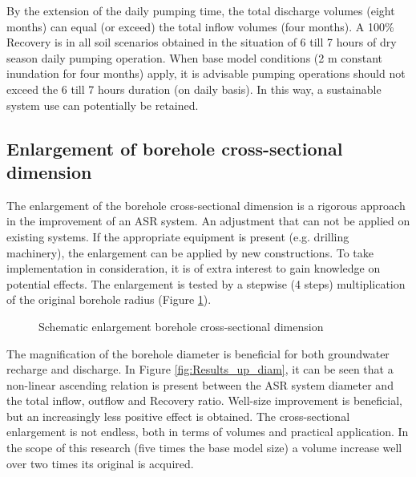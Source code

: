 By the extension of the daily pumping time, the total discharge volumes (eight months) can equal (or exceed) the total inflow volumes (four months). A 100\% Recovery is in all soil scenarios obtained in the situation of 6 till 7 hours of dry season daily pumping operation. When base model conditions (2 m constant inundation for four months) apply, it is advisable pumping operations should not exceed the 6 till 7 hours duration (on daily basis). In this way, a sustainable system use can potentially be retained. \\


\subsection{Enlargement of borehole cross-sectional dimension}
\label{Subsec:Up_diam}
The enlargement of the borehole cross-sectional dimension is a rigorous approach in the improvement of an ASR system. An adjustment that can not be applied on existing systems. If the appropriate equipment is present (e.g. drilling machinery), the enlargement can be applied by new constructions. To take implementation in consideration, it is of extra interest to gain knowledge on potential effects. The enlargement is tested by a stepwise (4 steps) multiplication of the original borehole radius (Figure \ref{fig:Schematic_up_diam}). 

\begin{figure}[h!]
\centering
{}
\captionsetup{justification=centering}
\caption{Schematic enlargement borehole cross-sectional dimension}
\label{fig:Schematic_up_diam}
\end{figure}

The magnification of the borehole diameter is beneficial for both groundwater recharge and discharge. In Figure \ref{fig:Results_up_diam}, it can be seen that a non-linear ascending relation is present between the ASR system diameter and the total inflow, outflow and Recovery ratio. Well-size improvement is beneficial, but an increasingly less positive effect is obtained. The cross-sectional enlargement is not endless, both in terms of volumes and practical application. In the scope of this research (five times the base model size) a volume increase well over two times its original is acquired. 

